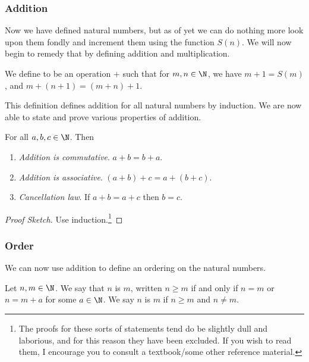\documentclass[a4paper]{scrartcl}
\begin{document}
\subsubsection{Addition}

Now we have defined natural numbers, but as of yet we can do nothing more look upon them fondly and increment them using the function $S(n)$. We will now begin to remedy that by defining addition and multiplication.

\begin{definition}[Addition]
	We define  to be an operation $+$ such that for $m, n \in \N$, we have $m + 1 = S(m)$, and $m + (n + 1) = (m + n) + 1$.
\end{definition}

This definition defines addition for all natural numbers by induction. We are now able to state and prove various properties of addition.

\begin{proposition}
	For all $a, b, c \in \N$. Then
	\begin{enumerate}[label=(\roman*)]
		\item \emph{Addition is commutative}. $a + b = b + a$.
		\item \emph{Addition is associative}. $(a + b) + c = a + (b + c)$. 
		\item \emph{Cancellation law}. If $a + b = a + c$ then $b = c$.
	\end{enumerate}
\end{proposition}
\begin{proof}[Proof Sketch]
	Use induction.\footnote{The proofs for these sorts of statements tend do be slightly dull and laborious, and for this reason they have been excluded. If you wish to read them, I encourage you to consult a textbook/some other reference material.}
\end{proof}

\subsubsection{Order}

We can now use addition to define an ordering on the natural numbers.

\begin{definition}
	Let $n, m \in \N$. We say that $n$ is  $m$, written $n \geq m$ if and only if $n = m$ or $n = m + a$ for some $a \in \N$. We say $n$ is  $m$ if $n \geq m$ and $n \neq m$.
\end{definition}
\end{document}

